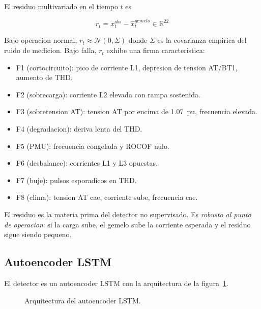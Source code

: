 El residuo multivariado en el tiempo $t$ es

\[
r_t = x_t^{obs} - \hat{x}_t^{gemelo} \in \mathbb{R}^{22}
\]

Bajo operacion normal, $r_t \approx \mathcal{N}(0, \Sigma)$ donde
$\Sigma$ es la covarianza empirica del ruido de medicion. Bajo
falla, $r_t$ exhibe una firma caracteristica:

\begin{itemize}[leftmargin=*,itemsep=2pt]
  \item F1 (cortocircuito): pico de corriente L1, depresion de
        tension AT/BT1, aumento de THD.
  \item F2 (sobrecarga): corriente L2 elevada con rampa sostenida.
  \item F3 (sobretension AT): tension AT por encima de 1.07~pu,
        frecuencia elevada.
  \item F4 (degradacion): deriva lenta del THD.
  \item F5 (PMU): frecuencia congelada y ROCOF nulo.
  \item F6 (desbalance): corrientes L1 y L3 opuestas.
  \item F7 (buje): pulsos esporadicos en THD.
  \item F8 (clima): tension AT cae, corriente sube, frecuencia cae.
\end{itemize}

El residuo es la materia prima del detector no supervisado. Es
\emph{robusto al punto de operacion}: si la carga sube, el gemelo
sube la corriente esperada y el residuo sigue siendo pequeno.

\subsection{Autoencoder LSTM}

El detector es un autoencoder LSTM con la arquitectura de la
figura~\ref{fig:ae}.

\begin{figure}[ht]
\centering
{}
\caption{Arquitectura del autoencoder LSTM.}
\label{fig:ae}
\end{figure}

